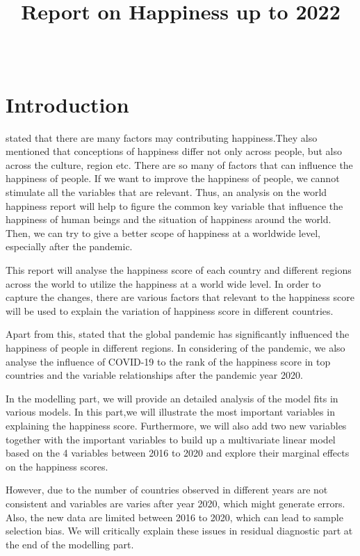 \documentclass[11pt,a4paper,]{article}
\title{Report on Happiness up to 2022}
\author{\sf{\Large\textbf{(Elvis) Zhixiang Yang}\\\large EBS Honours Student\\[0.5cm]}{\Large\textbf{Yiqi Wang}\\\large Master of BA Student\\[0.5cm]}{\Large\textbf{Xintong You}\\\large Master of BA Student\\[0.5cm]}}
\date{\sf\Date~\Month~\Year}
\makeatletter
\def\titlepage{\front{\expandafter{\@title}}{\@author}{\@organization}}
\makeatother
\begin{document}
\titlepage

{
\setcounter{tocdepth}{2}
\tableofcontents
}
\clearpage

\hypertarget{introduction}{%
\section{Introduction}\label{introduction}}

\textcite{rojas2010} stated that there are many factors may contributing happiness.They also mentioned that conceptions of happiness differ not only across people, but also across the culture, region etc. There are so many of factors that can influence the happiness of people. If we want to improve the happiness of people, we cannot stimulate all the variables that are relevant. Thus, an analysis on the world happiness report will help to figure the common key variable that influence the happiness of human beings and the situation of happiness around the world. Then, we can try to give a better scope of happiness at a worldwide level, especially after the pandemic.

This report will analyse the happiness score of each country and different regions across the world to utilize the happiness at a world wide level. In order to capture the changes, there are various factors that relevant to the happiness score will be used to explain the variation of happiness score in different countries.

Apart from this, \textcite{helliwell2021world} stated that the global pandemic has significantly influenced the happiness of people in different regions. In considering of the pandemic, we also analyse the influence of COVID-19 to the rank of the happiness score in top countries and the variable relationships after the pandemic year 2020.

In the modelling part, we will provide an detailed analysis of the model fits in various models. In this part,we will illustrate the most important variables in explaining the happiness score. Furthermore, we will also add two new variables together with the important variables to build up a multivariate linear model based on the 4 variables between 2016 to 2020 and explore their marginal effects on the happiness scores.

However, due to the number of countries observed in different years are not consistent and variables are varies after year 2020, which might generate errors. Also, the new data are limited between 2016 to 2020, which can lead to sample selection bias. We will critically explain these issues in residual diagnostic part at the end of the modelling part.
\end{document}
